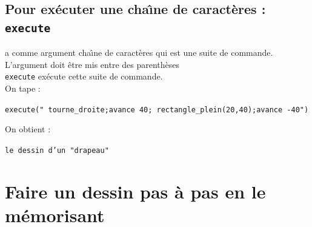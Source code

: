 \documentclass[a4paper,11pt]{book}
\begin{document}
\subsection{Pour ex\'ecuter une cha\^{\i}ne de caract\`eres : {\tt execute}}
 a comme argument cha\^{\i}ne de caract\`eres qui est 
une suite de commande. L'argument doit \^etre mis entre des parenth\`eses\\
{\tt execute} ex\'ecute cette suite de commande.\\
On tape :\\
\begin{center}{\tt execute(" tourne\_droite;avance 40; rectangle\_plein(20,40);avance -40")}\end{center}
On obtient :
\begin{center}{\tt le dessin d'un "drapeau"}\end{center}

\section{Faire un dessin pas \`a pas en le m\'emorisant}
\end{document}

